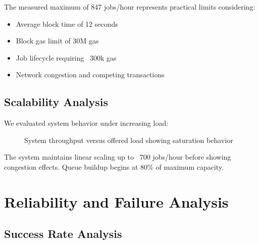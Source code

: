 The measured maximum of 847 jobs/hour represents practical limits considering:
\begin{itemize}
    \item Average block time of 12 seconds
    \item Block gas limit of 30M gas
    \item Job lifecycle requiring ~300k gas
    \item Network congestion and competing transactions
\end{itemize}

\subsection{Scalability Analysis}

We evaluated system behavior under increasing load:

\begin{figure}[h]
\centering
{}
\caption{System throughput versus offered load showing saturation behavior}
\label{fig:scalability}
\end{figure}

The system maintains linear scaling up to ~700 jobs/hour before showing congestion effects. Queue buildup begins at 80\% of maximum capacity.

\section{Reliability and Failure Analysis}

\subsection{Success Rate Analysis}

